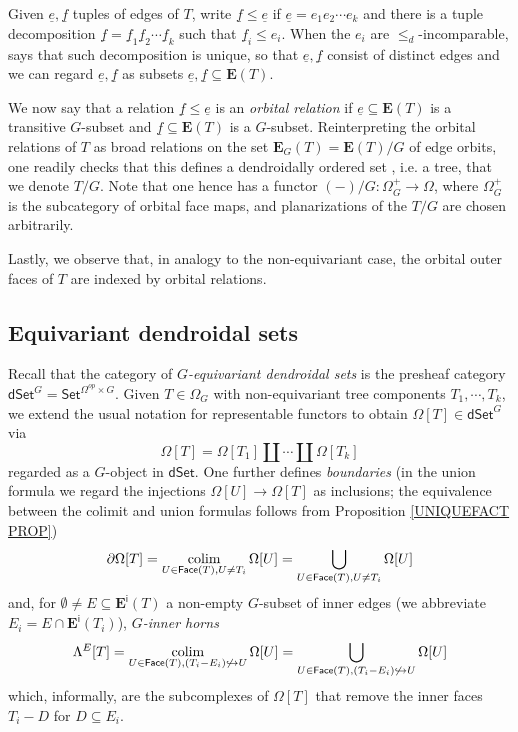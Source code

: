 \documentclass[a4paper,10pt
 ,draft
]{article}%
\begin{document}
\begin{remark}
Given $\underline{e},\underline{f}$ tuples of edges of $T$, 
write $\underline{f} \leq \underline{e}$
if $\underline{e} = e_1 e_2 \cdots e_k$
and there is a tuple decomposition
$\underline{f} = 
\underline{f}_1 \underline{f}_2 \cdots
\underline{f}_k$
such that $\underline{f}_i \leq e_i$.
When the $e_i$ are $\leq_d$-incomparable,
\cite[Prop. 5.30]{Per18} says that such decomposition is unique, so that $\underline{e},\underline{f}$ consist of distinct edges and we can regard 
$\underline{e},\underline{f}$ as subsets $\underline{e},\underline{f} \subseteq \boldsymbol{E}(T)$.
	
We now say that a relation
$\underline{f} \leq \underline{e}$	
is an \textit{orbital relation} if
$\underline{e} \subseteq \boldsymbol{E}(T)$
is a transitive $G$-subset and $\underline{f} \subseteq \boldsymbol{E}(T)$ is a $G$-subset. 
Reinterpreting the orbital relations of $T$ 
as broad relations on the set 
$\boldsymbol{E}_{G}(T) = \boldsymbol{E}(T)/G$ of edge orbits,
one readily checks that this defines a 
dendroidally ordered set \cite[Def. 5.9]{Per18},
i.e. a tree, that we denote $T/G$.
Note that one hence has a functor
$(-)/G \colon \Omega_G^+ \to \Omega$,
where $\Omega_G^+$ is the subcategory of orbital face maps,
and planarizations of the $T/G$ are chosen arbitrarily.

Lastly, we observe that, in analogy to the non-equivariant case,
the orbital outer faces of $T$ are indexed by orbital relations.
\end{remark}



\subsection{Equivariant dendroidal sets}\label{EQDENDSETS SEC}

Recall \cite[\S 5.4]{Per18} that the category of 
\textit{$G$-equivariant dendroidal sets}
is the presheaf category 
$\mathsf{dSet}^G = \mathsf{Set}^{\Omega^{op} \times G}$.
Given $T \in \Omega_G$ with non-equivariant tree components $T_1,\cdots,T_k$,
we extend the usual notation for representable functors 
to obtain $\Omega[T] \in \mathsf{dSet}^G$ via
\[
	\Omega[T] = \Omega[T_1] \amalg \cdots \amalg \Omega[T_k]
\]
regarded as a $G$-object in $\mathsf{dSet}$.
One further defines \textit{boundaries} (in the union formula we regard the injections $\Omega[U] \to \Omega[T]$ as inclusions; the equivalence between the colimit and union formulas follows from Proposition \ref{UNIQUEFACT PROP})
\[
	\partial \Omega[T] = 
	\mathop{\operatorname{colim}}_{U \in \mathsf{Face}(T),U \neq T_i}
	\Omega[U] =
	\bigcup_{U \in \mathsf{Face}(T),U \neq T_i}
	\Omega[U]
\]
and, for $\emptyset \neq E \subseteq \boldsymbol{E}^{\mathsf{i}}(T)$ a
non-empty $G$-subset of inner edges 
(we abbreviate $E_i = E \cap \boldsymbol{E}^{\mathsf{i}}(T_i)$), \textit{$G$-inner horns}
\[
	\Lambda^{E}[T] = 
	\mathop{\operatorname{colim}}_{U \in 
	\mathsf{Face}(T),
	(T_i - E_i) \not \hookrightarrow U}
	\Omega[U] =
	\bigcup_{U \in 
	\mathsf{Face}(T),
	(T_i - E_i) \not \hookrightarrow U}
	\Omega[U]
\]
which, informally, are the subcomplexes of $\Omega[T]$ that remove the inner faces $T_i-D$ for $D \subseteq E_i$.
\end{document}

